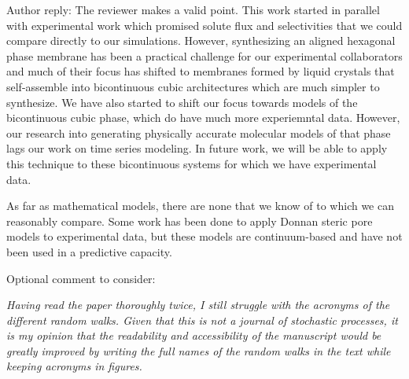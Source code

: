 \documentclass{article}
\begin{document}
\begin{enumerate}[label={Comment \theenumi :}, leftmargin=3.9\parindent]
		  Author reply: The reviewer makes a valid point. This work started in parallel with experimental
		  work which promised solute flux and selectivities that we could compare directly to our
		  simulations. However, synthesizing an aligned hexagonal phase membrane has been a practical
		  challenge for our experimental collaborators and much of their focus has shifted to 
		  membranes formed by liquid crystals that self-assemble into bicontinuous cubic architectures
		  which are much simpler to synthesize. We have also started to shift our focus towards models 
		  of the bicontinuous cubic phase, which do have much more experiemntal data. However, our research
                  into generating physically accurate 
		  molecular models of that phase lags our work on time series modeling. In future work, we will
		  be able to apply this technique to these bicontinuous systems for which we have experimental data.
		  

                  
		  As far as mathematical models, there are none that we know of to which we can reasonably
		  compare. Some work has been done to apply Donnan steric pore models to experimental data, 
		  but these models are continuum-based and have not been used in a predictive capacity.
		  
  \end{enumerate}

\noindent Optional comment to consider:\\
\begin{addmargin}[5.8em]{0em}
	\textit{Having read the paper thoroughly twice, I still struggle with the acronyms of the different random
	walks. Given that this is not a journal of stochastic processes, it is my opinion that the readability
	and accessibility of the manuscript would be greatly improved by writing the full names of the
	random walks in the text while keeping acronyms in figures. \\}

	
\end{addmargin}
\end{document}
